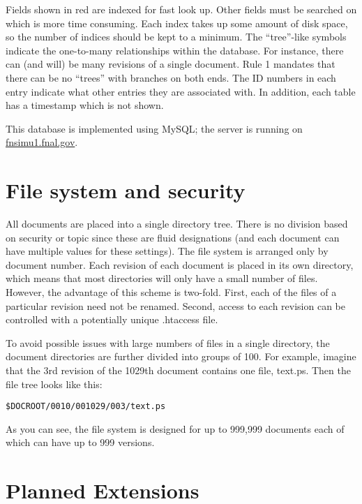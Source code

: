 \documentclass[12pt]{article}
\begin{document}
Fields shown in red are indexed for fast look up. Other fields must be searched
on which is more time consuming. Each index takes up some  amount of disk
space, so the number of indices should be kept to a minimum. The ``tree''-like
symbols indicate the one-to-many relationships within the database. For
instance, there can (and will) be many revisions of a  single document.  Rule 1
mandates that there can be no ``trees'' with branches on both ends. The ID
numbers in each entry indicate what other entries they are associated with. In
addition, each table has a timestamp which is not shown.

This database is implemented using MySQL; the server is running on
\url{fnsimu1.fnal.gov}.  

\section{File system and security}

All documents are placed into a single directory tree. There is no 
division based on security or topic since these are fluid designations 
(and each document can have multiple values for these settings). The 
file system is arranged only by document number. Each revision of each 
document is placed in its own directory, which means that most 
directories will only have a small number of files. However, the 
advantage of this scheme is two-fold. First, each of the files of a 
particular revision need not be renamed. Second, access to each 
revision can be controlled with a potentially unique .htaccess file.

To avoid possible issues with large numbers of files in a single 
directory, the document directories are further divided into groups of 
100. For example, imagine that the 3rd revision of the 1029th document 
contains one file, text.ps. Then the file tree looks like this:

\texttt{\$DOCROOT/0010/001029/003/text.ps}

As you can see, the file system is designed for up to 999,999 documents 
each of which can have up to 999 versions.

\section{Planned Extensions}
\end{document}

